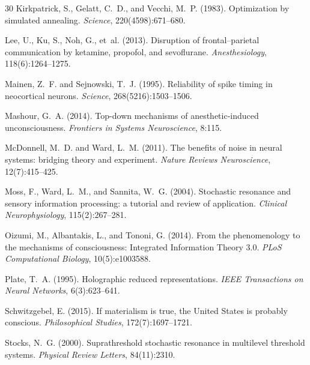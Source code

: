 \documentclass[12pt,a4paper]{article}
\begin{document}
\begin{thebibliography}{30}
Kirkpatrick, S., Gelatt, C.~D., and Vecchi, M.~P. (1983).
\newblock Optimization by simulated annealing.
\newblock \emph{Science}, 220(4598):671--680.

Lee, U., Ku, S., Noh, G., et~al. (2013).
\newblock Disruption of frontal--parietal communication by ketamine, propofol, and sevoflurane.
\newblock \emph{Anesthesiology}, 118(6):1264--1275.

Mainen, Z.~F. and Sejnowski, T.~J. (1995).
\newblock Reliability of spike timing in neocortical neurons.
\newblock \emph{Science}, 268(5216):1503--1506.

Mashour, G.~A. (2014).
\newblock Top-down mechanisms of anesthetic-induced unconsciousness.
\newblock \emph{Frontiers in Systems Neuroscience}, 8:115.

McDonnell, M.~D. and Ward, L.~M. (2011).
\newblock The benefits of noise in neural systems: bridging theory and experiment.
\newblock \emph{Nature Reviews Neuroscience}, 12(7):415--425.

Moss, F., Ward, L.~M., and Sannita, W.~G. (2004).
\newblock Stochastic resonance and sensory information processing: a tutorial and review of application.
\newblock \emph{Clinical Neurophysiology}, 115(2):267--281.

Oizumi, M., Albantakis, L., and Tononi, G. (2014).
\newblock From the phenomenology to the mechanisms of consciousness: Integrated Information Theory 3.0.
\newblock \emph{PLoS Computational Biology}, 10(5):e1003588.

Plate, T.~A. (1995).
\newblock Holographic reduced representations.
\newblock \emph{IEEE Transactions on Neural Networks}, 6(3):623--641.

Schwitzgebel, E. (2015).
\newblock If materialism is true, the United States is probably conscious.
\newblock \emph{Philosophical Studies}, 172(7):1697--1721.

Stocks, N.~G. (2000).
\newblock Suprathreshold stochastic resonance in multilevel threshold systems.
\newblock \emph{Physical Review Letters}, 84(11):2310.


\end{thebibliography}
\end{document}
